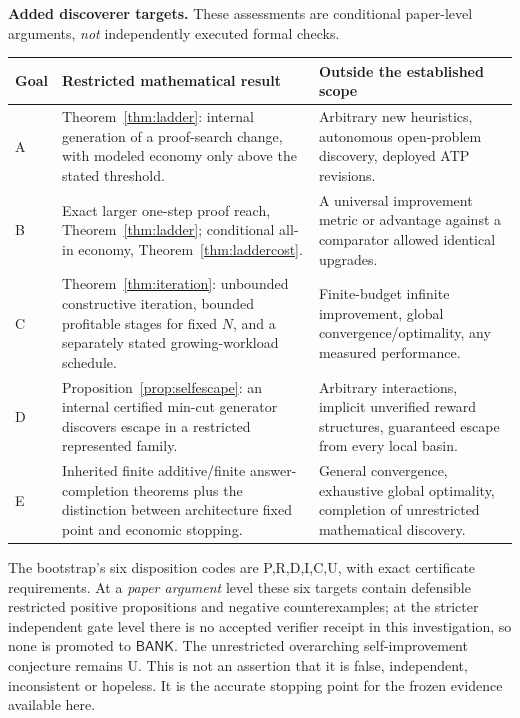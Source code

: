 \documentclass[11pt,letterpaper]{article}
\theoremstyle{definition}
\theoremstyle{remark}
\newcommand{\Bank}{\mathsf{BANK}}
\begin{document}
\noindent\textbf{Added discoverer targets.} These assessments are conditional paper-level arguments, \emph{not} independently executed formal checks.
\begin{center}\small
\begin{tabular}{p{}p{}p{}}
\toprule Goal & Restricted mathematical result & Outside the established scope \\ \midrule
A & Theorem~\ref{thm:ladder}: internal generation of a proof-search change, with modeled economy only above the stated threshold. & Arbitrary new heuristics, autonomous open-problem discovery, deployed ATP revisions. \\
B & Exact larger one-step proof reach, Theorem~\ref{thm:ladder}; conditional all-in economy, Theorem~\ref{thm:laddercost}. & A universal improvement metric or advantage against a comparator allowed identical upgrades. \\
C & Theorem~\ref{thm:iteration}: unbounded constructive iteration, bounded profitable stages for fixed $N$, and a separately stated growing-workload schedule. & Finite-budget infinite improvement, global convergence/optimality, any measured performance. \\
D & Proposition~\ref{prop:selfescape}: an internal certified min-cut generator discovers escape in a restricted represented family. & Arbitrary interactions, implicit unverified reward structures, guaranteed escape from every local basin. \\
E & Inherited finite additive/finite answer-completion theorems plus the distinction between architecture fixed point and economic stopping. & General convergence, exhaustive global optimality, completion of unrestricted mathematical discovery. \\ \bottomrule
\end{tabular}
\end{center}

The bootstrap's six disposition codes are \textsf{P,R,D,I,C,U}, with exact certificate requirements. At a \emph{paper argument} level these six targets contain defensible restricted positive propositions and negative counterexamples; at the stricter independent gate level there is no accepted verifier receipt in this investigation, so none is promoted to $\Bank$. The unrestricted overarching self-improvement conjecture remains \textsf{U}. This is not an assertion that it is false, independent, inconsistent or hopeless. It is the accurate stopping point for the frozen evidence available here.
\end{document}
